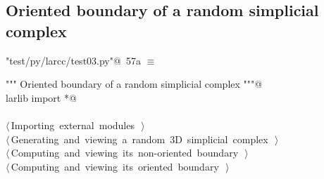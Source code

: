 \documentclass[11pt,oneside]{article}    %
\begin{document}
\subsection{Oriented boundary of a random simplicial complex}


\begin{flushleft} \small
\begin{minipage}{\linewidth} \label{scrap100}
\protect{}\verb@"test/py/larcc/test03.py"@\nobreak\ {\footnotesize 57a }$\equiv$
\vspace{-1ex}
\begin{list}{}{} \item
\mbox{}\verb@""" Oriented boundary of a random simplicial complex """@\\
\mbox{}\verb@from larlib import *@\\
\mbox{}\verb@@\\
\mbox{}\verb@@\hbox{$\langle\,$Importing external modules\nobreak\ {\footnotesize {}}$\,\rangle$}\verb@@\\
\mbox{}\verb@@\hbox{$\langle\,$Generating and viewing a random 3D simplicial complex\nobreak\ {\footnotesize {}}$\,\rangle$}\verb@@\\
\mbox{}\verb@@\hbox{$\langle\,$Computing and viewing its non-oriented boundary\nobreak\ {\footnotesize {}}$\,\rangle$}\verb@@\\
\mbox{}\verb@@\hbox{$\langle\,$Computing and viewing its oriented boundary\nobreak\ {\footnotesize {}}$\,\rangle$}\verb@@\\
\mbox{}\verb@@{\NWsep}
\end{list}
\vspace{-2ex}
\end{minipage}\\[4ex]
\end{flushleft}
\end{document}
